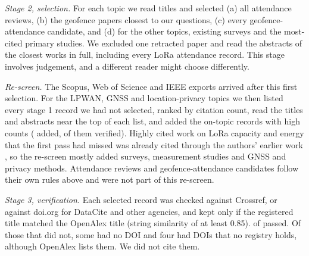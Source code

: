\documentclass[12pt]{article}
\let\cite\citep
\begin{document}
\emph{Stage 2, selection.} For each topic we read titles and selected (a) all attendance reviews, (b) the geofence papers closest to our questions, (c) every geofence-attendance candidate, and (d) for the other topics, existing surveys and the most-cited primary studies. We excluded one retracted paper and read the abstracts of the closest works in full, including every LoRa attendance record. This stage involves judgement, and a different reader might choose differently.

\emph{Re-screen.} The Scopus, Web of Science and IEEE exports arrived after this first selection. For the LPWAN, GNSS and location-privacy topics we then listed every stage 1 record we had not selected, ranked by citation count, read the titles and abstracts near the top of each list, and added the on-topic records with high counts (\nRescreen{} added, \nRescreenVer{} of them verified). Highly cited work on LoRa capacity and energy that the first pass had missed was already cited through the authors' earlier work \cite{bor2016scale,georgiou2017scale,casals2017energy}, so the re-screen mostly added surveys, measurement studies and GNSS and privacy methods. Attendance reviews and geofence-attendance candidates follow their own rules above and were not part of this re-screen.

\emph{Stage 3, verification.} Each selected record was checked against Crossref, or against doi.org for DataCite and other agencies, and kept only if the registered title matched the OpenAlex title (string similarity of at least 0.85). \nVerified{} of \nSelected{} passed. Of those that did not, some had no DOI and four had DOIs that no registry holds, although OpenAlex lists them. We did not cite them.
\end{document}
